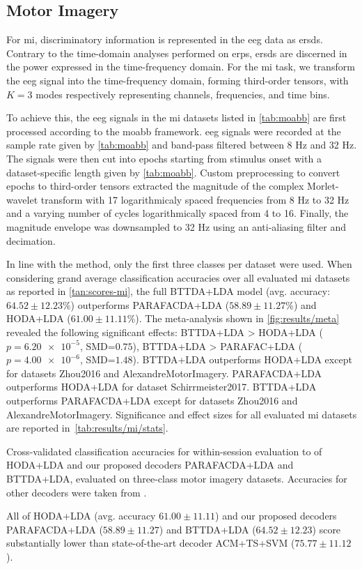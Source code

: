 \documentclass[twocolumn]{article}
\begin{document}
\subsection{Motor Imagery}

For \ac{mi}, discriminatory information is represented in the \ac{eeg} data as
\acp{ersd}.
Contrary to the time-domain analyses performed on \acp{erp}, \acp{ersd} are
discerned in the power expressed in the time-frequency domain.
For the \ac{mi} task, we transform the \ac{eeg} signal into the
time-frequency domain, forming third-order tensors, with $K=3$ modes
respectively representing channels, frequencies, and time bins.

To achieve this, the \ac{eeg} signals in the \ac{mi} datasets listed in \cref{tab:moabb}
are first processed according to the \ac{moabb} framework.
\ac{eeg} signals were recorded at the sample rate given
by \cref{tab:moabb} and band-pass filtered between 8 Hz
and 32 Hz.
The signals were then cut into epochs starting from stimulus onset with a
dataset-specific length given by \cref{tab:moabb}.
Custom preprocessing to convert epochs to third-order tensors extracted
the magnitude of the complex Morlet-wavelet transform with 17 logarithmicaly spaced frequencies from 8 Hz to 32 Hz and a varying number of cycles logarithmically spaced from 4 to 16.
Finally, the magnitude envelope was downsampled to 32 Hz using an anti-aliasing
filter and decimation.

In line with the \cite{moabb} method, only the first three classes per dataset were
used.
When considering grand average classification accuracies over all evaluated
\ac{mi} datasets as reported in \cref{tan:scores-mi},
the full BTTDA+LDA model (avg. accuracy: $64.52\pm12.23$\%)
outperforms PARAFACDA+LDA ($58.89\pm11.27$\%) and HODA+LDA
($61.00\pm11.11$\%).
The meta-analysis shown in \cref{fig:results/meta} revealed the following significant effects:
BTTDA+LDA > HODA+LDA ($p=\num{6.20e-5}$, SMD=$0.75$),
BTTDA+LDA > PARAFAC+LDA ($p=\num{4.00e-6}$, SMD=$1.48$).
BTTDA+LDA outperforms HODA+LDA except for datasets Zhou2016 and AlexandreMotorImagery.
PARAFACDA+LDA outperforms HODA+LDA for dataset Schirrmeister2017.
BTTDA+LDA outperforms PARAFACDA+LDA except for datasets Zhou2016 and AlexandreMotorImagery.
Significance and effect sizes for all evaluated \ac{mi} datasets are reported in~\cref{tab:results/mi/stats}.

\begin{sidewaystable*}
	\footnotesize
	
	\caption{Cross-validated classification accuracies for within-session evaluation
		to
		of HODA+LDA and our proposed decoders	PARAFACDA+LDA and BTTDA+LDA,
		evaluated on three-class motor imagery datasets.
		Accuracies for other decoders were taken from \textcite{Chevallier2024}.}%
	\label{tab:mi-score}%
\end{sidewaystable*}
All of HODA+LDA (avg. accuracy $61.00\pm11.11$) and our proposed decoders PARAFACDA+LDA
($58.89\pm11.27$) and BTTDA+LDA ($64.52\pm12.23$) score
substantially lower than state-of-the-art decoder ACM+TS+SVM ($75.77\pm11.12$).
\end{document}
